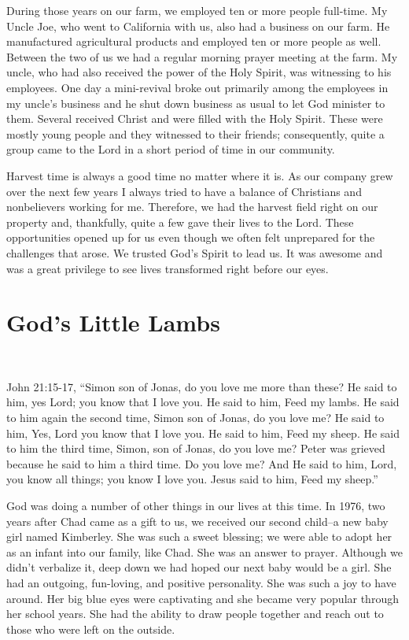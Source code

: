 \documentclass[oneside]{book}
\begin{document}
During those years on our farm, we employed ten or more people full-time. My Uncle Joe, who went to California with us, also had a business on our farm. He manufactured agricultural products and employed ten or more people as well. Between the two of us we had a regular morning prayer meeting at the farm. My uncle, who had also received the power of the Holy Spirit, was witnessing to his employees. One day a mini-revival broke out primarily among the employees in my uncle’s business and he shut down business as usual to let God minister to them. Several received Christ and were filled with the Holy Spirit. These were mostly young people and they witnessed to their friends; consequently, quite a group came to the Lord in a short period of time in our community.

Harvest time is always a good time no matter where it is. As our company grew over the next few years I always tried to have a balance of Christians and nonbelievers working for me. Therefore, we had the harvest field right on our property and, thankfully, quite a few gave their lives to the Lord. These opportunities opened up for us even though we often felt unprepared for the challenges that arose. We trusted God's Spirit to lead us. It was awesome and was a great privilege to see lives transformed right before our eyes.


\section{God's Little Lambs}
\

John 21:15-17, “Simon son of Jonas, do you love me more than these? He said to him, yes Lord; you know that I love you. He said to him, Feed my lambs. He said to him again the second time, Simon son of Jonas, do you love me? He said to him, Yes, Lord you know that I love you. He said to him, Feed my sheep. He said to him the third time, Simon, son of Jonas, do you love me? Peter was grieved because he said to him a third time. Do you love me? And He said to him, Lord, you know all things; you know I love you. Jesus said to him, Feed my sheep.”

God was doing a number of other things in our lives at this time. In 1976, two years after Chad came as a gift to us, we received our second child--a new baby girl named Kimberley. She was such a sweet blessing; we were able to adopt her as an infant into our family, like Chad. She was an answer to prayer. Although we didn't verbalize it, deep down we had hoped our next baby would be a girl. She had an outgoing, fun-loving, and positive personality. She was such a joy to have around. Her big blue eyes were captivating and she became very popular through her school years. She had the ability to draw people together and reach out to those who were left on the outside.
\end{document}
